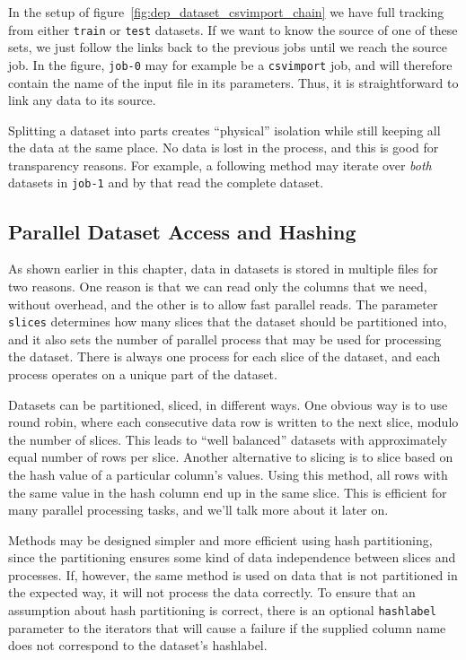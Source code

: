 In the setup of figure~\ref{fig:dep_dataset_csvimport_chain} we have
full tracking from either \texttt{train} or \texttt{test} datasets.
If we want to know the source of one of these sets, we just follow the
links back to the previous jobs until we reach the source job.  In the
figure, \texttt{job-0} may for example be a \texttt{csvimport} job,
and will therefore contain the name of the input file in its
parameters.  Thus, it is straightforward to link any data to its
source.

Splitting a dataset into parts creates ``physical'' isolation while
still keeping all the data at the same place.  No data is lost in the
process, and this is good for transparency reasons.  For example, a
following method may iterate over \textsl{both} datasets in
\texttt{job-1} and by that read the complete dataset.



\subsection{Parallel Dataset Access and Hashing}
As shown earlier in this chapter, data in datasets is stored in
multiple files for two reasons.  One reason is that we can read only
the columns that we need, without overhead, and the other is to allow
fast parallel reads.  The parameter \texttt{slices} determines how
many slices that the dataset should be partitioned into, and it also
sets the number of parallel process that may be used for processing
the dataset.  There is always one process for each slice of the
dataset, and each process operates on a unique part of the dataset.

Datasets can be partitioned, sliced, in different ways.  One obvious
way is to use round robin, where each consecutive data row is written
to the next slice, modulo the number of slices.  This leads to ``well
balanced'' datasets with approximately equal number of rows per slice.
Another alternative to slicing is to slice based on the hash value of
a particular column's values.  Using this method, all rows with the
same value in the hash column end up in the same slice.  This is
efficient for many parallel processing tasks, and we'll talk more
about it later on.

Methods may be designed simpler and more efficient using hash
partitioning, since the partitioning ensures some kind of data
independence between slices and processes.  If, however, the same
method is used on data that is not partitioned in the expected way, it
will not process the data correctly.  To ensure that an assumption
about hash partitioning is correct, there is an optional
\texttt{hashlabel} parameter to the iterators that will cause a
failure if the supplied column name does not correspond to the
dataset's hashlabel.

